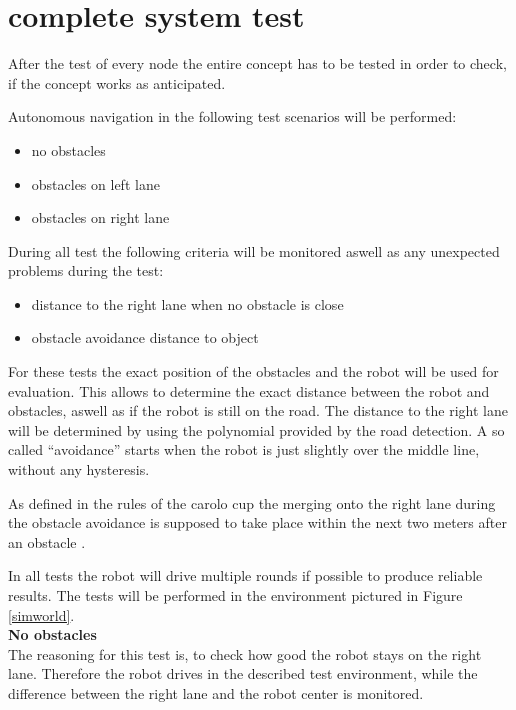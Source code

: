 \section{complete system test}

After the test of every node the entire concept has to be tested in order to check, if the concept works as anticipated.

Autonomous navigation in the following test scenarios will be performed:

\begin{itemize}
	\item no obstacles
	\item obstacles on left lane
	\item obstacles on right lane
\end{itemize}

During all test the following criteria will be monitored aswell as any unexpected problems during the test:

\begin{itemize}
	\item distance to the right lane when no obstacle is close
	\item obstacle avoidance distance to object
\end{itemize}

For these tests the exact position of the obstacles and the robot will be used for evaluation. This allows to determine the exact distance between the robot and obstacles, aswell as if the robot is still on the road. The distance to the right lane will be determined by using the polynomial provided by the road detection. A so called ``avoidance'' starts when the robot is just slightly over the middle line, without any hysteresis.

As defined in the rules of the carolo cup the merging onto the right lane during the obstacle avoidance is supposed to take place within the next two meters after an obstacle \cite{carolo-cup}.

In all tests the robot will drive multiple rounds if possible to produce reliable results. The tests will be performed in the environment pictured in Figure \ref{simworld}.\\

\textbf{No obstacles}\\
The reasoning for this test is, to check how good the robot stays on the right lane. Therefore the robot drives in the described test environment, while the difference between the right lane and the robot center is monitored.

